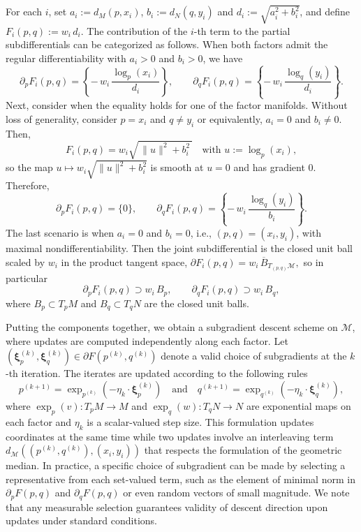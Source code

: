 \documentclass[10pt]{article}
\newcommand{\calM}{\mathcal{M}}
\begin{document}
For each $i$, set $a_i:=d_M(p,x_i)$, $b_i:=d_N(q,y_i)$ and $d_i:=\sqrt{a_i^2+b_i^2}$, and define
$F_i(p,q):=w_i\,d_i$. The contribution of the $i$-th term to the partial subdifferentials can be categorized as follows. When both factors admit the regular differentiability with $a_i>0$ and $b_i > 0$, we have 
\[
\partial_p F_i(p,q)=\left\lbrace-\,w_i\,\frac{\log_p(x_i)}{d_i}\right\rbrace,
\qquad
\partial_q F_i(p,q)=\left\lbrace -\,w_i\,\frac{\log_q(y_i)}{d_i}\right\rbrace.
\]
Next, consider when the equality holds for one of the factor manifolds. Without loss of generality, consider $p=x_i$ and $q \neq y_i$ or equivalently,  $a_i = 0$ and $b_i \neq 0$. Then,
\[
F_i(p,q)=w_i\sqrt{\,\|u\|^2+b_i^2\,}\quad\text{with }u:=\log_p(x_i),
\]
so the map $u\mapsto w_i\sqrt{\|u\|^2+b_i^2}$ is smooth at $u=0$ and has gradient $0$.
Therefore,
\[
\partial_p F_i(p,q)=\{0\},\qquad
\partial_q F_i(p,q)=\left\lbrace -\,w_i\,\frac{\log_q(y_i)}{b_i}\right\rbrace.
\]
The last scenario is when $a_i=0$ and $b_i=0$, i.e., $(p,q)=(x_i,y_i)$, with maximal nondifferentiability. Then the joint subdifferential is the closed unit ball scaled by $w_i$ in the product tangent space,
$
\partial F_i(p,q)=w_i\,\overline{B}_{T_{(p,q)}\mathcal{M}},
$
so in particular
\[
\partial_p F_i(p,q)\supset w_i\,B_p,\qquad
\partial_q F_i(p,q)\supset w_i\,B_q,
\]
where $B_p\subset T_pM$ and $B_q\subset T_qN$ are the closed unit balls.






Putting the components together, we obtain a subgradient descent scheme on $\calM$, where updates are computed independently along each factor. Let $(\boldsymbol{\xi}_p^{(k)}, \boldsymbol{\xi}_q^{(k)}) \in \partial F(p^{(k)}, q^{(k)})$ denote a valid choice of subgradients at the $k$-th iteration. The iterates are updated according to the following rules 
\begin{equation*}
p^{(k+1)} = \exp_{p^{(k)}}(-\eta_k \cdot \boldsymbol{\xi}_p^{(k)})\quad\text{and}\quad 
q^{(k+1)} = \exp_{q^{(k)}}(-\eta_k \cdot \boldsymbol{\xi}_q^{(k)}),
\end{equation*}
where $\exp_p(v):T_pM \to M$ and $\exp_q(w):T_q N \to N$ are exponential maps on each factor and $\eta_k$ is a scalar-valued step size.  This formulation updates coordinates at the same time while two updates involve an interleaving term $d_\calM ((p^{(k)},q^{(k)}), (x_i, y_i))$ that respects the formulation of the geometric median. In practice, a specific choice of subgradient can be made by selecting a representative from each set-valued term, such as the element of minimal norm in $\partial_p F(p,q)$ and $\partial_q F(p,q)$ or even random vectors of small magnitude. We note that any measurable selection guarantees validity of descent direction upon updates under standard conditions. 
\end{document}
